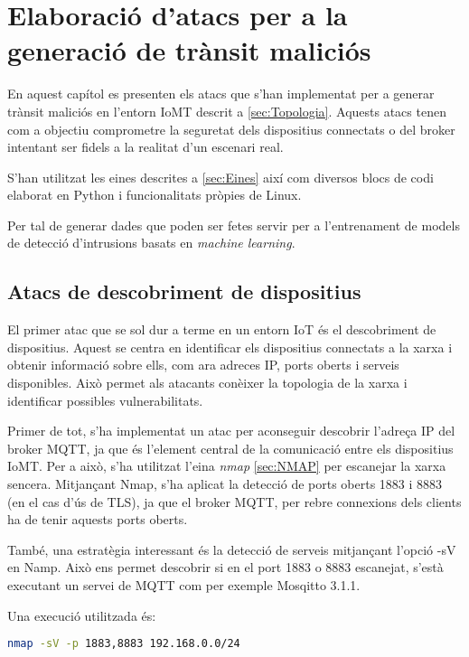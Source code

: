 \chapter{Elaboració d'atacs per a la generació de trànsit maliciós}

En aquest capítol es presenten els atacs que s'han implementat per a generar trànsit maliciós en l'entorn IoMT descrit a \ref{sec:Topologia}. Aquests atacs tenen com a objectiu comprometre la seguretat dels dispositius connectats o del broker intentant ser fidels a la realitat d'un escenari real. 

S'han utilitzat les eines descrites a \ref{sec:Eines} així com diversos blocs de codi elaborat en Python i funcionalitats pròpies de Linux. 


Per tal de generar dades que poden ser fetes servir per a l'entrenament de models de detecció d'intrusions basats en \textit{machine learning}.



\section{Atacs de descobriment de dispositius}
\label{sec:Recon}

El primer atac que se sol dur a terme en un entorn IoT és el descobriment de dispositius. Aquest se centra en identificar els dispositius connectats a la xarxa i obtenir informació sobre ells, com ara adreces IP, ports oberts i serveis disponibles. Això permet als atacants conèixer la topologia de la xarxa i identificar possibles vulnerabilitats.

Primer de tot, s'ha implementat un atac per aconseguir descobrir l'adreça IP del broker MQTT, ja que és l'element central de la comunicació entre els dispositius IoMT. Per a això, s'ha utilitzat l'eina \textit{nmap} \ref{sec:NMAP} per escanejar la xarxa sencera. Mitjançant Nmap, s'ha aplicat la detecció de ports oberts 1883 i 8883 (en el cas d'ús de TLS), ja que el broker MQTT, per rebre connexions dels clients ha de tenir aquests ports oberts.

També, una estratègia interessant és la detecció de serveis mitjançant l'opció -sV en Namp. Això ens permet descobrir si en el port 1883 o 8883 escanejat, s'està executant un servei de MQTT com per exemple Mosqitto 3.1.1.

Una execució utilitzada és:
\begin{lstlisting}[language=bash, caption={Escaneig Nmap}, label=Escaneig Nmap]
    nmap -sV -p 1883,8883 192.168.0.0/24
\end{lstlisting}

